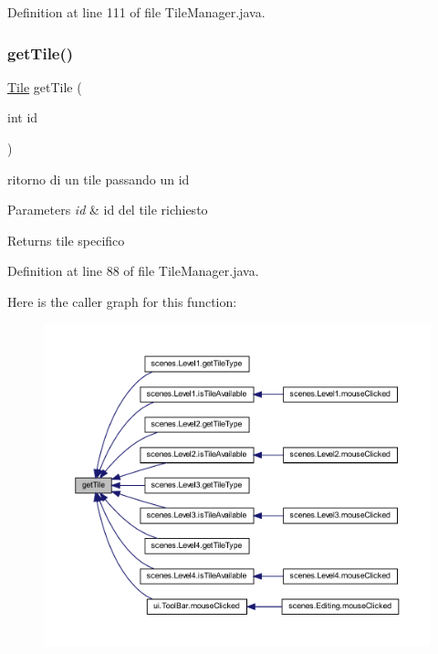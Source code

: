 Definition at line 111 of file Tile\+Manager.\+java.

\mbox{\label{classmanagers_1_1_tile_manager_a1855b58fdbe502789d9c14ee0deffb9e}} 
\subsubsection{\texorpdfstring{get\+Tile()}{getTile()}}
{\footnotesize\ttfamily \hyperlink{classobjects_1_1_tile}{Tile} get\+Tile (\begin{DoxyParamCaption}\item[{int}]{id }\end{DoxyParamCaption})}



ritorno di un tile passando un id 


\begin{DoxyParams}{Parameters}
{\em id} & id del tile richiesto\\
\hline
\end{DoxyParams}
\begin{DoxyReturn}{Returns}
tile specifico 
\end{DoxyReturn}


Definition at line 88 of file Tile\+Manager.\+java.

Here is the caller graph for this function\+:\nopagebreak
\begin{figure}[H]
\begin{center}
\leavevmode
\includegraphics[width=350pt]{classmanagers_1_1_tile_manager_a1855b58fdbe502789d9c14ee0deffb9e_icgraph}
\end{center}
\end{figure}
\mbox{\label{classmanagers_1_1_tile_manager_afc6b9f4a25216ec36baa6e7518a7501a}} 
